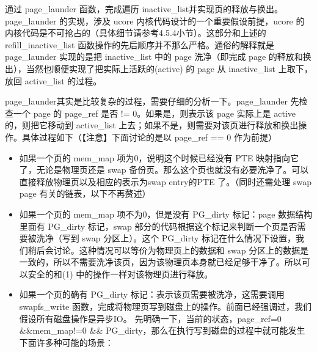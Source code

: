 通过 page\_launder 函数，完成遍历
inactive\_list并实现页的释放与换出。page\_launder 的实现，涉及 ucore
内核代码设计的一个重要假设前提，ucore
的内核代码是不可抢占的（具体细节请参考4.5.4小节）。这部分和上述的refill\_inactive\_list
函数操作的先后顺序并不那么严格。通俗的解释就是 page\_launder 实现的是把
inactive\_list 中的 page 洗净（即完成 page
的释放和换出），当然也顺便实现了把实际上活跃的(active) 的 page 从
inactive\_list 上取下，放回 active\_list 的过程。

page\_launder其实是比较复杂的过程，需要仔细的分析一下。page\_launder
先检查一个 page 的 page\_ref 是否 != 0。如果是，则表示该 page 实际上是
active 的，则把它移动到 active\_list
上去；如果不是，则需要对该页进行释放和换出操作。具体过程如下（【注意】下面讨论的是以
page\_ref == 0 作为前提）

\begin{itemize}
\item
  如果一个页的 mem\_map 项为0，说明这个时候已经没有 PTE
  映射指向它了，无论是物理页还是 swap
  备份页。那么这个页也就没有必要洗净了。可以直接释放物理页以及相应的表示为swap
  entry的PTE 了。（同时还需处理 swap page 有关的链表，以下不再赘述）
\item
  如果一个页的 mem\_map 项不为0，但是没有 PG\_dirty 标记：page
  数据结构里面有 PG\_dirty 标记，swap
  部分的代码根据这个标记来判断一个页是否需要被洗净（写到 swap
  分区上）。这个 PG\_dirty
  标记在什么情况下设置，我们稍后会讨论。这种情况可以等价为物理页上的数据和
  swap
  分区上的数据是一致的，所以不需要洗净该页，因为该物理页本身就已经足够干净了。所以可以安全的和(1)
  中的操作一样对该物理页进行释放。
\item
  如果一个页的确有 PG\_dirty 标记：表示该页需要被洗净，这需要调用
  swapfs\_write
  函数，完成将物理页写到磁盘上的操作。前面已经强调过，我们假设所有磁盘操作是异步IO。
  先明确一下，当前的状态，page\_ref=0 \&\&mem\_map!=0 \&\&
  PG\_dirty，那么在执行写到磁盘的过程中就可能发生下面许多种可能的场景：
\end{itemize}

